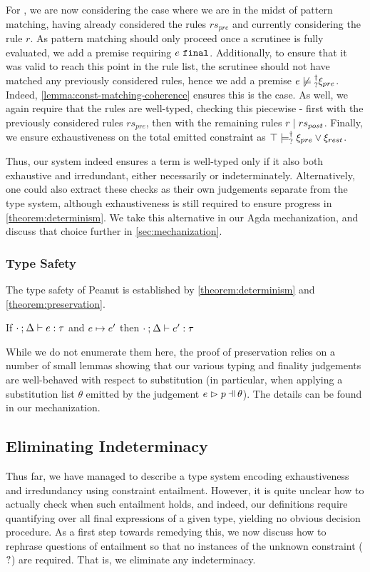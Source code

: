 For \TMatchNZPre, we are now considering the case where we are in the midst of pattern matching, having already considered the rules $rs_{pre}$ and currently considering the rule $r$. As pattern matching should only proceed once a scrutinee is fully evaluated, we add a premise requiring $e ~\mathtt{final}$. Additionally, to ensure that it was valid to reach this point in the rule list, the scrutinee should not have matched any previously considered rules, hence we add a premise $\cnotsatisfyormay{e}{\xi_{pre}}$. Indeed, \autoref{lemma:const-matching-coherence} ensures this is the case. As well, we again require that the rules are well-typed, checking this piecewise - first with the previously considered rules $rs_{pre}$, then with the remaining rules $r \mid rs_{post}$. Finally, we ensure exhaustiveness on the total emitted constraint as $\top \models_{?}^{\dag} \xi_{pre} \vee \xi_{rest}$.

Thus, our system indeed ensures a term is well-typed only if it also both exhaustive and irredundant, either necessarily or indeterminately. Alternatively, one could also extract these checks as their own judgements separate from the type system, although exhaustiveness is still required to ensure progress in \autoref{theorem:determinism}. We take this alternative in our Agda mechanization, and discuss that choice further in \autoref{sec:mechanization}.

\subsubsection{Type Safety}
The type safety of Peanut is established by \autoref{theorem:determinism} and \autoref{theorem:preservation}.

\begin{theorem}[Preservation]
	\label{theorem:preservation}
	If $\cdot \mathbin{;} \Delta \vdash e : \tau$ and $e \mapsto e'$
	then $\cdot \mathbin{;} \Delta \vdash e' : \tau$
\end{theorem}
While we do not enumerate them here, the proof of preservation relies on a number of small lemmas showing that our various typing and finality judgements are well-behaved with respect to substitution (in particular, when applying a substitution list $\theta$ emitted by the judgement $\hpatmatch{e}{p}{\theta}$). The details can be found in our mechanization.

\subsection{Eliminating Indeterminacy}\label{sec:analyses}
Thus far, we have managed to describe a type system encoding exhaustiveness and irredundancy using constraint entailment. However, it is quite unclear how to actually check when such entailment holds, and indeed, our definitions require quantifying over all final expressions of a given type, yielding no obvious decision procedure. As a first step towards remedying this, we now discuss how to rephrase questions of entailment so that no instances of the unknown constraint ($\mathtt{?}$) are required. That is, we eliminate any indeterminacy.


